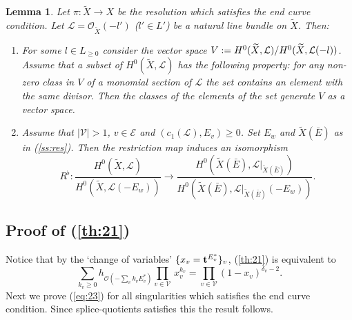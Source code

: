 \documentclass[10pt,a4paper]{amsart}
\numberwithin{equation}{section}
\numberwithin{equation}{subsection}
\theoremstyle{plain}
\newtheorem{lemma}[equation]{Lemma}
\theoremstyle{definition}
\begin{document}
\begin{lemma}\label{lem:35} \cite{Gabor}
Let $\pi:\widetilde{X}\to X$ be the resolution  which satisfies
the {\em end curve condition}. Let ${\mathcal{L}}
={\mathcal{O}}_{\widetilde{X}}(-l')$ ($l'\in L'$) be a natural line bundle
on $\widetilde{X}$. Then:
\begin{enumerate}
 \item\label{lem:35.1} For some \(l \in L_{{} \geq 0}\)
    consider the vector space
    \(V:={\mathchoice
         \frac{{H^0(\widetilde{X},
    {\mathcal{L}})}}{{H^0(\widetilde{X},{\mathcal{L}}( - l ))}}   
  {\mathinner{{{H^0(\widetilde{X},
    {\mathcal{L}})}}/{{H^0(\widetilde{X},{\mathcal{L}}( - l ))}}}}
  {\mathinner{{{H^0(\widetilde{X},
    {\mathcal{L}})}}/{{H^0(\widetilde{X},{\mathcal{L}}( - l ))}}}}
  {\mathinner{{{H^0(\widetilde{X},
    {\mathcal{L}})}}/{{H^0(\widetilde{X},{\mathcal{L}}( - l ))}}}}
}\).
    Assume that a subset of $H^0(\widetilde{X},
    {\mathcal{L}})$ has the following property:
     for any non-zero class in $V$ of a monomial section of
     ${\mathcal{L}}$ the set contains an element with the same divisor.
     Then the classes of the elements of the set generate $V$ as a vector space.

  \item\label{lem:35.2} Assume that $|{\mathcal{V}}|>1$,  \(v\in{\mathcal{E}}\) and
    \(( c_1({\mathcal{L}} ),E_v)\geq 0\).
    Set $E_w$ and ${\widetilde{X}(\bar{E})}$ as in (\ref{ss:res}). Then the restriction map
    induces an isomorphism
    \begin{equation}
      \label{eq:3.9}R^\flat:
      \frac{H^0( \widetilde{X},{\mathcal{L}})}{H^0(\widetilde{X},
      {\mathcal{L}}( - E_w ))} \longrightarrow
      \frac{H^0( {\widetilde{X}(\bar{E})},{\mathcal{L}}|_{\widetilde{X}(\bar{E})})}{H^0({\widetilde{X}(\bar{E})},{\mathcal{L}} |_{\widetilde{X}(\bar{E})}( - E_w ))}.
    \end{equation}
\end{enumerate}
\end{lemma}

\subsection{Proof of (\ref{th:21})}\label{ss:prth2.1}
Notice that by the  `change of variables' $\{x_v={{\bf t}}^{E^*_v}\}_v$,
(\ref{th:21}) is equivalent to
\begin{equation}\label{eq:23}
\sum _{k_v\geq 0} h_{{\mathcal{O}}(-\sum_v k_v E_v^*)}\prod_{v\in {\mathcal{V}}}\,
x_v^{k_v}=\prod_{v\in {\mathcal{V}}} (1-x_v)^{\delta_v-2}.
\end{equation}
Next we prove (\ref{eq:23}) for all  singularities which satisfies
the end curve condition. Since splice-quotients satisfies this the
result follows.
\end{document}
